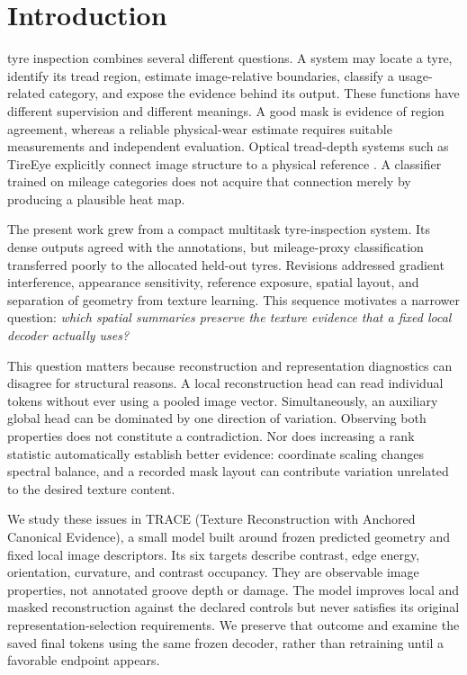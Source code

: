 \section{Introduction}\label{sec:introduction}
 tyre inspection combines several different questions. A system may locate a tyre, identify its tread region, estimate image-relative boundaries, classify a usage-related category, and expose the evidence behind its output. These functions have different supervision and different meanings. A good mask is evidence of region agreement, whereas a reliable physical-wear estimate requires suitable measurements and independent evaluation. Optical tread-depth systems such as TireEye explicitly connect image structure to a physical reference \cite{tireeye}. A classifier trained on mileage categories does not acquire that connection merely by producing a plausible heat map.

The present work grew from a compact multitask tyre-inspection system. Its dense outputs agreed with the annotations, but mileage-proxy classification transferred poorly to the allocated held-out tyres. Revisions addressed gradient interference, appearance sensitivity, reference exposure, spatial layout, and separation of geometry from texture learning. This sequence motivates a narrower question: \emph{which spatial summaries preserve the texture evidence that a fixed local decoder actually uses?}

This question matters because reconstruction and representation diagnostics can disagree for structural reasons. A local reconstruction head can read individual tokens without ever using a pooled image vector. Simultaneously, an auxiliary global head can be dominated by one direction of variation. Observing both properties does not constitute a contradiction. Nor does increasing a rank statistic automatically establish better evidence: coordinate scaling changes spectral balance, and a recorded mask layout can contribute variation unrelated to the desired texture content.

We study these issues in TRACE (Texture Reconstruction with Anchored Canonical Evidence), a small model built around frozen predicted geometry and fixed local image descriptors. Its six targets describe contrast, edge energy, orientation, curvature, and contrast occupancy. They are observable image properties, not annotated groove depth or damage. The model improves local and masked reconstruction against the declared controls but never satisfies its original representation-selection requirements. We preserve that outcome and examine the saved final tokens using the same frozen decoder, rather than retraining until a favorable endpoint appears.

